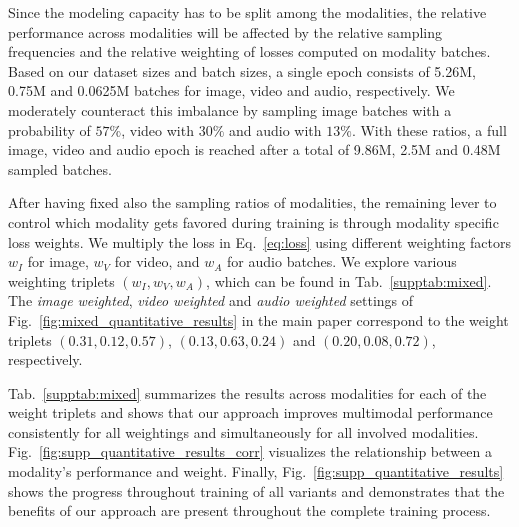 \documentclass{article}
\theoremstyle{plain}
\theoremstyle{definition}
\theoremstyle{remark}
\begin{document}
Since the modeling capacity has to be split among the modalities, the relative performance across modalities will be affected by the relative sampling frequencies and the relative weighting of losses computed on modality batches. Based on our dataset sizes and batch sizes, a single epoch consists of 5.26M, 0.75M and 0.0625M batches for image, video and audio, respectively. We moderately counteract this imbalance by sampling image batches with a probability of $57\%$, video with $30\%$ and audio with $13\%$. With these ratios, a full image, video and audio epoch is reached after a total of 9.86M, 2.5M and 0.48M sampled batches.

After having fixed also the sampling ratios of modalities, the remaining lever to control which modality gets favored during training is through modality specific loss weights. We multiply the loss in Eq.~\eqref{eq:loss} using different weighting factors $w_I$ for image, $w_V$ for video, and $w_A$ for audio batches. We explore various weighting triplets $(w_I, w_V, w_A)$, which can be found in Tab.~\ref{supptab:mixed}. The \emph{image weighted}, \emph{video weighted} and \emph{audio weighted} settings of Fig.~\ref{fig:mixed_quantitative_results} in the main paper correspond to the weight triplets $(0.31,0.12,0.57)$, $(0.13,0.63,0.24)$ and $(0.20,0.08,0.72)$, respectively.

Tab.~\ref{supptab:mixed} summarizes the results across modalities for each of the weight triplets and shows that our approach improves multimodal performance consistently for all weightings and simultaneously for all involved modalities. Fig.~\ref{fig:supp_quantitative_results_corr} visualizes the relationship between a modality's performance and weight. Finally, Fig.~\ref{fig:supp_quantitative_results} shows the progress throughout training of all variants and demonstrates that the benefits of our approach are present throughout the complete training process.
\end{document}
